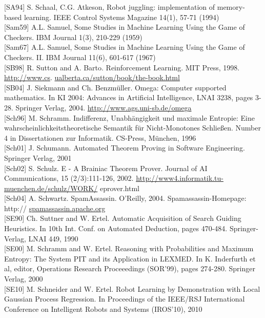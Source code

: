 \documentclass[10pt]{article}
\begin{document}
[SA94] S. Schaal, C.G. Atkeson, Robot juggling: implementation of memory-based learning. IEEE Control Systems Magazine 14(1), 57-71 (1994)\\[0pt]
[Sam59] A.L. Samuel, Some Studies in Machine Learning Using the Game of Checkers. IBM Journal 1(3), 210-229 (1959)\\[0pt]
[Sam67] A.L. Samuel, Some Studies in Machine Learning Using the Game of Checkers. II. IBM Journal 11(6), 601-617 (1967)\\[0pt]
[SB98] R. Sutton and A. Barto. Reinforcement Learning. MIT Press, 1998. \href{http://www.cs}{http://www.cs}. \href{http://ualberta.ca/sutton/book/the-book.html}{ualberta.ca/sutton/book/the-book.html}\\[0pt]
[SB04] J. Siekmann and Ch. Benzmüller. Omega: Computer supported mathematics. In KI 2004: Advances in Artificial Intelligence, LNAI 3238, pages 3-28. Springer Verlag, 2004. \href{http://www.ags.uni-sb.de/omega}{http://www.ags.uni-sb.de/omega}\\[0pt]
[Sch96] M. Schramm. Indifferenz, Unabhängigkeit und maximale Entropie: Eine wahrscheinlichkeitstheoretische Semantik für Nicht-Monotones Schließen. Number 4 in Dissertationen zur Informatik. CS-Press, München, 1996\\[0pt]
[Sch01] J. Schumann. Automated Theorem Proving in Software Engineering. Springer Verlag, 2001\\[0pt]
[Sch02] S. Schulz. E - A Brainiac Theorem Prover. Journal of AI Communications, 15 (2/3):111-126, 2002. \href{http://www4.informatik.tu-muenchen.de/schulz/WORK/}{http://www4.informatik.tu-muenchen.de/schulz/WORK/} eprover.html\\[0pt]
[Sch04] A. Schwartz. SpamAssassin. O'Reilly, 2004. Spamassassin-Homepage: http:// \href{http://spamassassin.apache.org}{spamassassin.apache.org}\\[0pt]
[SE90] Ch. Suttner and W. Ertel. Automatic Acquisition of Search Guiding Heuristics. In 10th Int. Conf. on Automated Deduction, pages 470-484. Springer-Verlag, LNAI 449, 1990\\[0pt]
[SE00] M. Schramm and W. Ertel. Reasoning with Probabilities and Maximum Entropy: The System PIT and its Application in LEXMED. In K. Inderfurth et al, editor, Operations Research Proceeedings (SOR'99), pages 274-280. Springer Verlag, 2000\\[0pt]
[SE10] M. Schneider and W. Ertel. Robot Learning by Demonstration with Local Gaussian Process Regression. In Proceedings of the IEEE/RSJ International Conference on Intelligent Robots and Systems (IROS'10), 2010\\[0pt]
\end{document}
